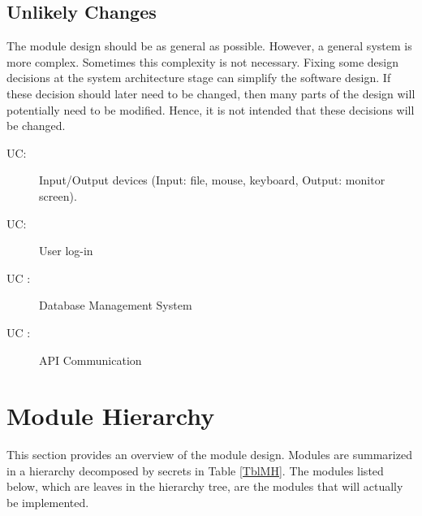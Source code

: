 \documentclass[12pt, titlepage]{article}
\newcounter{ucnum}
\newcommand{\uctheucnum}{UC\theucnum}
\begin{document}
\subsection{Unlikely Changes} \label{SecUchange}

The module design should be as general as possible. However, a general system is
more complex. Sometimes this complexity is not necessary. Fixing some design
decisions at the system architecture stage can simplify the software design. If
these decision should later need to be changed, then many parts of the design
will potentially need to be modified. Hence, it is not intended that these
decisions will be changed.

\begin{description}
\item[ \uctheucnum \label{ucIO}:] Input/Output devices
  (Input: file, mouse, keyboard, Output: monitor screen).
\item[ \uctheucnum \label{ucIO}:] User log-in
\item[ \uctheucnum
\label{ucIO}:] Database Management System
\item[ \uctheucnum
\label{ucIO}:] API Communication
\end{description}

\section{Module Hierarchy} \label{SecMH}

This section provides an overview of the module design. Modules are summarized
in a hierarchy decomposed by secrets in Table \ref{TblMH}. The modules listed
below, which are leaves in the hierarchy tree, are the modules that will
actually be implemented.
\end{document}
